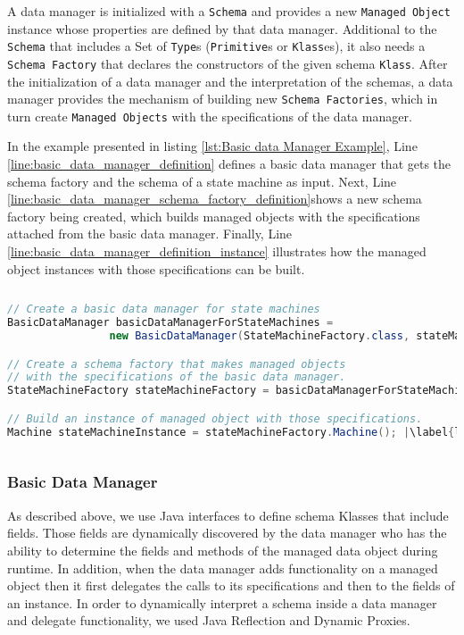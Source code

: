 A data manager is initialized with a \texttt{Schema} and provides a new \texttt{Managed Object} instance whose properties are defined by that data manager.
Additional to the \texttt{Schema} that includes a Set of \texttt{Type}s (\texttt{Primitive}s or \texttt{Klass}es), it also needs a \texttt{Schema Factory} that declares the constructors of the given schema \texttt{Klass}.
After the initialization of a data manager and the interpretation of the schemas, a data manager provides the mechanism of building new \texttt{Schema Factories}, which in turn create \texttt{Managed Objects} with the specifications of the data manager.

In the example presented in listing \ref{lst:Basic data Manager Example}, Line \ref{line:basic_data_manager_definition} defines a basic data manager that gets the schema factory and the schema of a state machine as input. 
Next, Line \ref{line:basic_data_manager_schema_factory_definition}shows a new schema factory being created, which builds managed objects with the specifications attached from the basic data manager.
Finally, Line \ref{line:basic_data_manager_definition_instance} illustrates how the managed object instances with those specifications can be built.

\begin{sourcecode} [H]
	\begin{lstlisting}[language=Java, escapechar=|]
// Create a basic data manager for state machines
BasicDataManager basicDataManagerForStateMachines = 
				new BasicDataManager(StateMachineFactory.class, stateMachineSchema); |\label{line:basic_data_manager_definition}|

// Create a schema factory that makes managed objects 
// with the specifications of the basic data manager.
StateMachineFactory stateMachineFactory = basicDataManagerForStateMachines.make(); |\label{line:basic_data_manager_schema_factory_definition}|

// Build an instance of managed object with those specifications.
Machine stateMachineInstance = stateMachineFactory.Machine(); |\label{line:basic_data_manager_definition_instance}|
	\end{lstlisting}
	\caption{Basic data Manager Example}
	\label{lst:Basic data Manager Example}
\end{sourcecode}

\subsubsection{Basic Data Manager}
As described above, we use Java interfaces to define schema Klasses that include fields. 
Those fields are dynamically discovered by the data manager who has the ability to determine the fields and methods of the managed data object during runtime.
In addition, when the data manager adds functionality on a managed object then it first delegates the calls to its specifications and then to the fields of an instance.
In order to dynamically interpret a schema inside a data manager and delegate functionality, we used Java Reflection and Dynamic Proxies.

